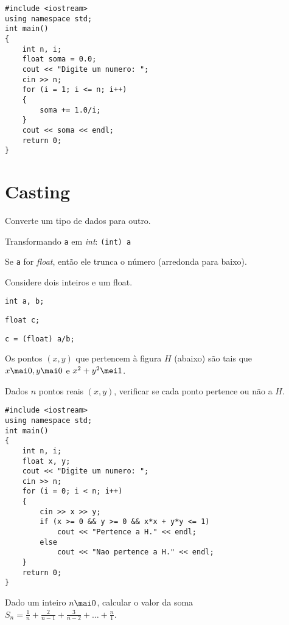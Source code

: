 \documentclass[a4paper]{memoir}
\begin{document}
\begin{sol}
\begin{lstlisting}
#include <iostream>
using namespace std;
int main()
{
    int n, i;
    float soma = 0.0;
    cout << "Digite um numero: ";
    cin >> n;
    for (i = 1; i <= n; i++)
    {
        soma += 1.0/i;
    }
    cout << soma << endl;
    return 0;
}
\end{lstlisting}
\end{sol}

\section{Casting}

Converte um tipo de dados para outro.

\begin{ex}
Transformando \verb|a| em \emph{int}: \verb|(int) a|
\end{ex}

Se \verb|a| for \emph{float}, então ele trunca o número (arredonda para baixo).

\begin{ex}
Considere dois inteiros e um float.

\verb|int a, b;|

\verb|float c;|

\verb|c = (float) a/b;|
\end{ex}

\begin{prob}\label{prob203.cpp}
Os pontos $(x,y)$ que pertencem à figura $H$ (abaixo) são tais que\\
$x \mai 0, y \mai 0$ e $x^2 + y^2 \mei 1$.


Dados $n$ pontos reais $(x,y)$, verificar se cada ponto pertence ou não a $H$.
\end{prob}

\begin{sol}
\begin{lstlisting}
#include <iostream>
using namespace std;
int main()
{
    int n, i;
    float x, y;
    cout << "Digite um numero: ";
    cin >> n;
    for (i = 0; i < n; i++)
    {
        cin >> x >> y;
        if (x >= 0 && y >= 0 && x*x + y*y <= 1)
            cout << "Pertence a H." << endl;
        else
            cout << "Nao pertence a H." << endl;
    }
    return 0;
}
\end{lstlisting}
\end{sol}

\begin{ex}[extra]
Dado um inteiro $n \mai 0$, calcular o valor da soma\\
$S_n = \frac{1}{n} + \frac{2}{n-1} + \frac{3}{n-2} + \ldots + \frac{n}{1}$.
\end{ex}
\end{document}
